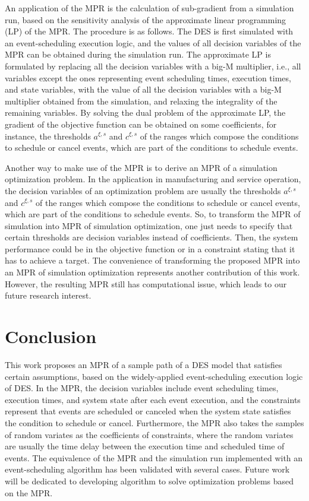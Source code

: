 \documentclass[]{interact}
\theoremstyle{plain}%
\theoremstyle{definition}
\theoremstyle{remark}
\begin{document}
An application of the MPR is the calculation of sub-gradient from a simulation run, based on the sensitivity analysis of the approximate linear programming (LP) of the MPR. The procedure is as follows. The DES is first simulated with an event-scheduling execution logic, and the values of all decision variables of the MPR can be obtained during the simulation run. The approximate LP is formulated by replacing all the decision variables with a big-M multiplier, i.e., all variables except the ones representing event scheduling times, execution times, and state variables, with the value of all the decision variables with a big-M multiplier obtained from the simulation, and relaxing the integrality of the remaining variables. By solving the dual problem of the approximate LP, the gradient of the objective function can be obtained on some coefficients, for instance, the thresholds $a^{\xi,s}$ and $c^{\xi,s}$ of the ranges which compose the conditions to schedule or cancel events, which are part of the conditions to schedule events. 

Another way to make use of the MPR is to derive an MPR of a simulation optimization problem. In the application in manufacturing and service operation, the decision variables of an optimization problem are usually the thresholds $a^{\xi,s}$ and $c^{\xi,s}$ of the ranges which compose the conditions to schedule or cancel events, which are part of the conditions to schedule events. So, to transform the MPR of simulation into MPR of simulation optimization, one just needs to specify that certain thresholds are decision variables instead of coefficients. Then, the system performance could be in the objective function or in a constraint stating that it has to achieve a target. The convenience of transforming the proposed MPR into an MPR of simulation optimization represents another contribution of this work. However, the resulting MPR still has computational issue, which leads to our future research interest.



\section{Conclusion}\label{sec:conclusion}

This work proposes an MPR of a sample path of a DES model that satisfies certain assumptions, based on the widely-applied event-scheduling execution logic of DES. In the MPR, the decision variables include event scheduling times, execution times, and system state after each event execution, and the constraints represent that events are scheduled or canceled when the system state satisfies the condition to schedule or cancel. Furthermore, the MPR also takes the samples of random variates as the coefficients of constraints, where the random variates are usually the time delay between the execution time and scheduled time of events. The equivalence of the MPR and the simulation run implemented with an event-scheduling algorithm has been validated with several cases. Future work will be dedicated to developing algorithm to solve optimization problems based on the MPR.
\end{document}
